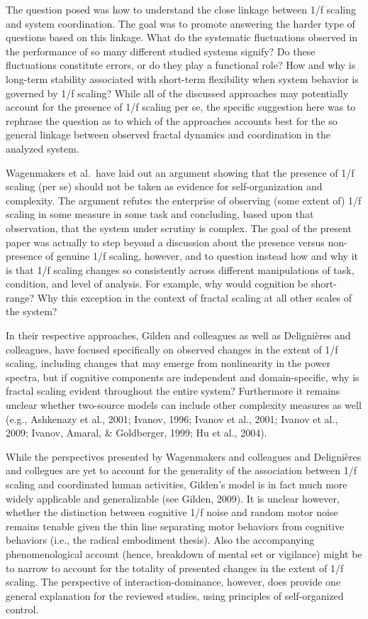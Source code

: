 \documentclass[12pt,]{book}
\begin{document}
The question posed was how to understand the close linkage between 1/f scaling and system coordination. The goal was to promote answering the harder type of questions based on this linkage. What do the systematic fluctuations observed in the performance of so many different studied systems signify? Do these fluctuations constitute errors, or do they play a functional role? How and why is long-term stability associated with short-term flexibility when system behavior is governed by 1/f scaling? While all of the discussed approaches may potentially account for the presence of 1/f scaling per se, the specific suggestion here was to rephrase the question as to which of the approaches accounts best for the so general linkage between observed fractal dynamics and coordination in the analyzed system.

Wagenmakers et al.~have laid out an argument showing that the presence of 1/f scaling (per se) should not be taken as evidence for self-organization and complexity. The argument refutes the enterprise of observing (some extent of) 1/f scaling in some measure in some task and concluding, based upon that observation, that the system under scrutiny is complex. The goal of the present paper was actually to step beyond a discussion about the presence versus non-presence of genuine 1/f scaling, however, and to question instead how and why it is that 1/f scaling changes so consistently across different manipulations of task, condition, and level of analysis. For example, why would cognition be short-range? Why this exception in the context of fractal scaling at all other scales of the system?

In their respective approaches, Gilden and colleagues as well as Delignières and colleagues, have focused specifically on observed changes in the extent of 1/f scaling, including changes that may emerge from nonlinearity in the power spectra, but if cognitive components are independent and domain-specific, why is fractal scaling evident throughout the entire system?
Furthermore it remains unclear whether two-source models can include other complexity measures as well (e.g., Ashkenazy et al., 2001; Ivanov, 1996; Ivanov et al., 2001; Ivanov et al., 2009; Ivanov, Amaral, \& Goldberger, 1999; Hu et al., 2004).

While the perspectives presented by Wagenmakers and colleagues and Delignières and collegues are yet to account for the generality of the association between 1/f scaling and coordinated human activities, Gilden's model is in fact much more widely applicable and generalizable (see Gilden, 2009). It is unclear however, whether the distinction between cognitive 1/f noise and random motor noise remains tenable given the thin line separating motor behaviors from cognitive behaviors (i.e., the radical embodiment thesis). Also the accompanying phenomenological account (hence, breakdown of mental set or vigilance) might be to narrow to account for the totality of presented changes in the extent of 1/f scaling. The perspective of interaction-dominance, however, does provide one general explanation for the reviewed studies, using principles of self-organized control.
\end{document}
